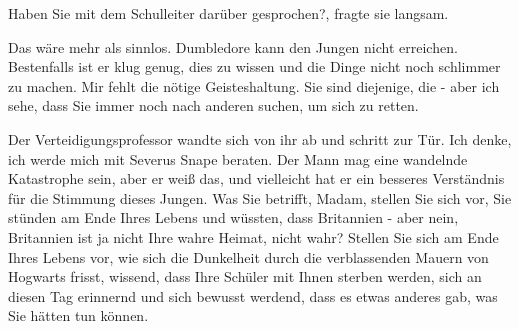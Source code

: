 \glqq{}Haben Sie mit dem Schulleiter darüber gesprochen?\grqq{}, fragte sie
langsam.

\glqq{}Das wäre mehr als sinnlos. Dumbledore kann den Jungen nicht erreichen.
Bestenfalls ist er klug genug, dies zu wissen und die Dinge nicht noch schlimmer
zu machen. Mir fehlt die nötige Geisteshaltung. Sie sind diejenige, die - aber
ich sehe, dass Sie immer noch nach anderen suchen, um sich zu retten.\grqq{}

Der Verteidigungsprofessor wandte sich von ihr ab und schritt zur Tür. \glqq{}Ich
denke, ich werde mich mit Severus Snape beraten. Der Mann mag eine wandelnde
Katastrophe sein, aber er weiß das, und vielleicht hat er ein besseres
Verständnis für die Stimmung dieses Jungen. Was Sie betrifft, Madam, stellen Sie
sich vor, Sie stünden am Ende Ihres Lebens und wüssten, dass Britannien - aber
nein, Britannien ist ja nicht Ihre wahre Heimat, nicht wahr? Stellen Sie sich am
Ende Ihres Lebens vor, wie sich die Dunkelheit durch die verblassenden Mauern
von Hogwarts frisst, wissend, dass Ihre Schüler mit Ihnen sterben werden, sich
an diesen Tag erinnernd und sich bewusst werdend, dass es etwas anderes gab, was
Sie hätten tun können.\grqq{}

